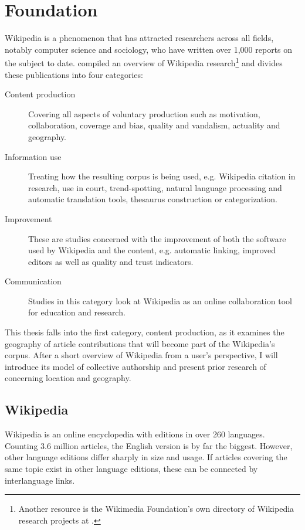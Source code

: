 \chapter{Foundation}\label{ch:foundation}

Wikipedia is a phenomenon that has attracted researchers across all fields, notably computer science and sociology, who have written over 1,000 reports on the subject to date.
\textcite{nielsen2011wikipedia} compiled an overview of Wikipedia research\footnote{Another resource is the Wikimedia Foundation's own directory of Wikipedia research projects at .} and divides these publications into four categories: 
\begin{description}
\item[Content production] Covering all aspects of voluntary production such as motivation, collaboration, coverage and bias, quality and vandalism, actuality and geography.
\item[Information use] Treating how the resulting corpus is being used, e.g. Wikipedia citation in research, use in court, trend-spotting, natural language processing and automatic translation tools, thesaurus construction or categorization.
\item[Improvement] These are studies concerned with the improvement of both the software used by Wikipedia and the content, e.g. automatic linking, improved editors as well as quality and trust indicators. 
\item[Communication] Studies in this category look at Wikipedia as an online collaboration tool for education and research. 
\end{description}

This thesis falls into the first category, content production, as it examines the geography of article contributions that will become part of the Wikipedia's corpus.
After a short overview of Wikipedia from a user's perspective, I will introduce its model of collective authorship and present prior research of concerning location and geography. 

\section{Wikipedia}\label{sec:wikipedia}

Wikipedia is an online encyclopedia with editions in over 260 languages.
Counting 3.6 million articles, the English version is by far the biggest.
However, other language editions differ sharply in size and usage.\cite{wikistats}
If articles covering the same topic exist in other language editions, these can be connected by interlanguage links.

